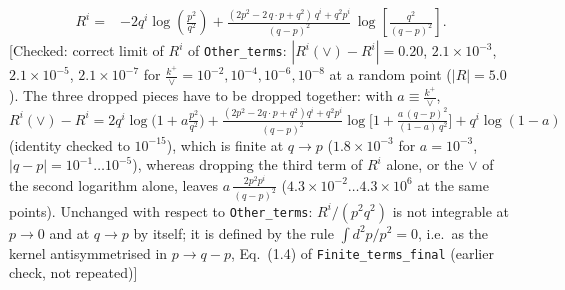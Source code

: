 \documentclass[9pt]{article}
\numberwithin{equation}{section}
\begin{document}
\begin{align}
R^{i} =& -2q^{i}\log\left(\frac{p^{2}}{q^{2}}\right)
+\frac{(2p^{2}-2\,q\cdot p+q^{2})\,q^{i}+q^{2}p^{i}}{(q-p)^{2}}\,
\log\left[\frac{q^{2}}{(q-p)^{2}}\right].
\end{align} {\color{red}[Checked: correct limit of $R^{i}$ of \texttt{Other\_terms}: $|R^{i}(\vee)-R^{i}|=0.20$, $2.1\times10^{-3}$, $2.1\times10^{-5}$, $2.1\times10^{-7}$ for $\frac{k^{+}}{\vee}=10^{-2},10^{-4},10^{-6},10^{-8}$ at a random point ($|R|=5.0$). The three dropped pieces have to be dropped together: with $a\equiv\frac{k^{+}}{\vee}$, $R^{i}(\vee)-R^{i}=2q^{i}\log\big(1+a\frac{p^{2}}{q^{2}}\big)+\frac{(2p^{2}-2q\cdot p+q^{2})q^{i}+q^{2}p^{i}}{(q-p)^{2}}\log\big[1+\frac{a\,(q-p)^{2}}{(1-a)\,q^{2}}\big]+q^{i}\log(1-a)$ (identity checked to $10^{-15}$), which is finite at $q\to p$ ($1.8\times10^{-3}$ for $a=10^{-3}$, $|q-p|=10^{-1}\dots10^{-5}$), whereas dropping the third term of $R^{i}$ alone, or the $\vee$ of the second logarithm alone, leaves $a\,\frac{2p^{2}p^{i}}{(q-p)^{2}}$ ($4.3\times10^{-2}\dots4.3\times10^{6}$ at the same points). Unchanged with respect to \texttt{Other\_terms}: $R^{i}/(p^{2}q^{2})$ is not integrable at $p\to0$ and at $q\to p$ by itself; it is defined by the rule $\int d^{2}p/p^{2}=0$, i.e.\ as the kernel antisymmetrised in $p\to q-p$, Eq.~(1.4) of \texttt{Finite\_terms\_final} (earlier check, not repeated)]}\par\noindent
\end{document}
